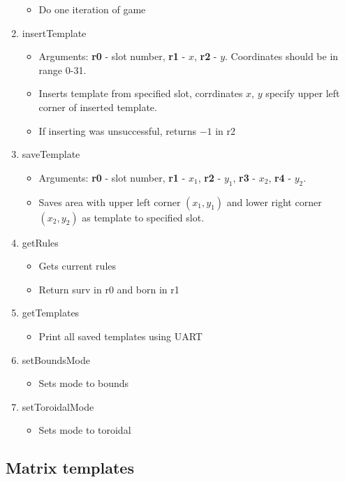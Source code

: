 \begin{enumerate}
\begin{itemize}
			\item Do one iteration of game
		\end{itemize}
	\item insertTemplate
		\begin{itemize}
			\item Arguments: \textbf{r0} - slot number, \textbf{r1} - $x$, \textbf{r2} - $y$. Coordinates should be in range 0-31.
			\item Inserts template from specified slot, corrdinates $x$, $y$ specify upper left corner of inserted template.
			\item If inserting was unsuccessful, returns $-1$ in r2
		\end{itemize}
	\item saveTemplate
		\begin{itemize}
			\item Arguments: \textbf{r0} - slot number, \textbf{r1} - $x_{1}$, \textbf{r2} - $y_{1}$, \textbf{r3} - $x_{2}$, \textbf{r4} - $y_{2}$.
			\item Saves area with upper left corner $(x_{1}, y_{1})$ and lower right corner $(x_{2}, y_{2})$ as template to specified slot.
		\end{itemize}
	\item getRules
		\begin{itemize}
			\item Gets current rules
			\item Return surv in r0 and born in r1
		\end{itemize}
	\item getTemplates
		\begin{itemize}
			\item Print all saved templates using UART
		\end{itemize}
	\item setBoundsMode
		\begin{itemize}
			\item Sets mode to bounds
		\end{itemize}
	\item setToroidalMode
		\begin{itemize}
			\item Sets mode to toroidal
		\end{itemize}
\end{enumerate}

\subsection*{Matrix templates}

